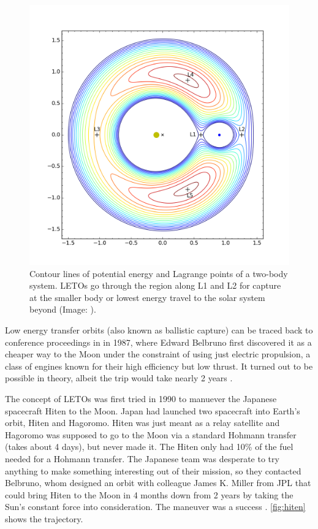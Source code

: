 \begin{figure}[ht]
    \centering
    \includegraphics[width=0.65\linewidth]{fig/lagrange-points-energy-contour-lines.png}
    \caption{Contour lines of potential energy and Lagrange points of a two-body system. LETOs go through the region along L1 and L2 for capture at the smaller body or lowest energy travel to the solar system beyond (Image: \cite{Drang}).}
    \label{fig:lagrange-points-energy-contour-lines}
\end{figure}
Low energy transfer orbits (also known as ballistic capture) can be traced back to conference proceedings in in 1987, where Edward Belbruno first discovered it as a cheaper way to the Moon under the constraint of using just electric propulsion, a class of engines known for their high efficiency but low thrust. It turned out to be possible in theory, albeit the trip would take nearly 2 years \cite{Belbruno1987, Benson}.

The concept of LETOs was first tried in 1990 to manuever the Japanese spacecraft Hiten to the Moon. Japan had launched two spacecraft into Earth's orbit, Hiten and Hagoromo. Hiten was just meant as a relay satellite and Hagoromo was supposed to go to the Moon via a standard Hohmann transfer (takes about 4 days), but never made it. The Hiten only had 10\% of the fuel needed for a Hohmann transfer. The Japanese team was desperate to try anything to make something interesting out of their mission, so they contacted Belbruno, whom designed an orbit with colleague James K. Miller from JPL that could bring Hiten to the Moon in 4 months down from 2 years by taking the Sun's constant force into consideration. The maneuver was a success \cite{Belbuno1990} \cite{Benson}. \cref{fig:hiten} shows the trajectory.

